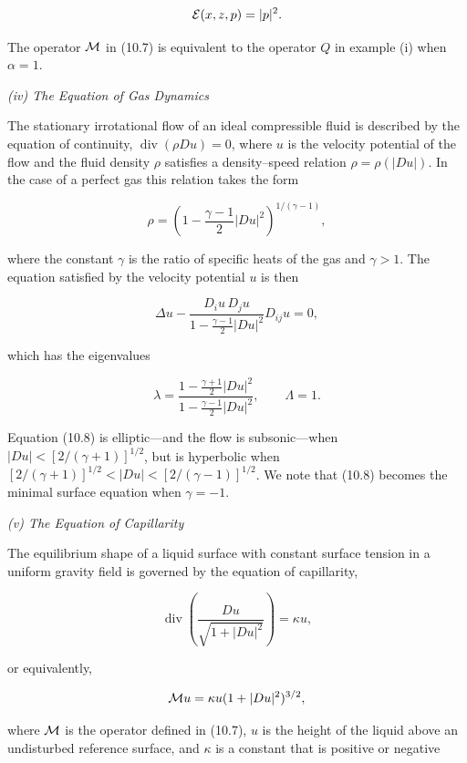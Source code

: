 \[
\mathcal{E}(x, z, p) = |p|^2 .
\]

The operator $\mathcal{M}$ in (10.7) is equivalent to the operator $Q$ in example (i) when $\alpha = 1$.

\medskip

\noindent\textit{(iv) The Equation of Gas Dynamics}

The stationary irrotational flow of an ideal compressible fluid is described by the equation of continuity, $\operatorname{div} (\rho D u)=0$, where $u$ is the velocity potential of the flow and the fluid density $\rho$ satisfies a density--speed relation $\rho=\rho(|Du|)$. In the case of a perfect gas this relation takes the form

\[
\rho = \left( 1 - \frac{\gamma - 1}{2} |Du|^2 \right)^{1/(\gamma - 1)},
\]

where the constant $\gamma$ is the ratio of specific heats of the gas and $\gamma > 1$. The equation satisfied by the velocity potential $u$ is then

\begin{equation}
\tag{10.8}
\Delta u - \frac{D_i u \, D_j u}{1 - \frac{\gamma - 1}{2} |Du|^2} D_{ij} u = 0,
\end{equation}

which has the eigenvalues

\[
\lambda = \frac{1 - \frac{\gamma + 1}{2} |Du|^2}{1 - \frac{\gamma - 1}{2} |Du|^2}, \qquad \Lambda = 1.
\]

Equation (10.8) is elliptic---and the flow is subsonic---when $|Du| < [2/(\gamma + 1)]^{1/2}$, but is hyperbolic when $[2/(\gamma + 1)]^{1/2} < |Du| < [2/(\gamma - 1)]^{1/2}$. We note that (10.8) becomes the minimal surface equation when $\gamma = -1$.

\medskip

\noindent\textit{(v) The Equation of Capillarity}

The equilibrium shape of a liquid surface with constant surface tension in a uniform gravity field is governed by the equation of capillarity,

\begin{equation}
\tag{10.9}
\operatorname{div}\left( \frac{D u}{\sqrt{1 + |Du|^2}} \right) = \kappa u,
\end{equation}

or equivalently,

\[
\mathcal{M} u = \kappa u (1 + |Du|^2)^{3/2},
\]

where $\mathcal{M}$ is the operator defined in (10.7), $u$ is the height of the liquid above an undisturbed reference surface, and $\kappa$ is a constant that is positive or negative


